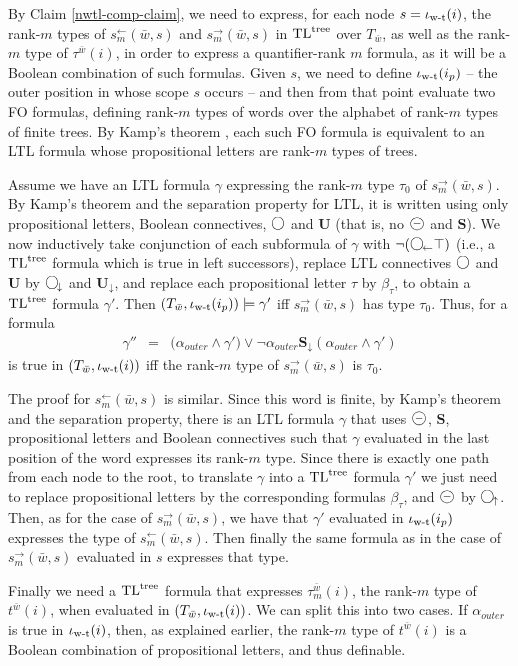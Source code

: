 \documentclass{LMCS}
\newcommand{\w}{{\bar{w}}}
\newcommand{\dm}{\Diamond}
\newcommand{\X}{{\mathbf X}}
\newcommand{\U}{{\mathbf U}}
\renewcommand{\S}{{\mathbf S}}
\newcommand{\next}{\text{\raisebox{1pt}{$\bigcirc$}}}
\renewcommand{\X}{\next}
\newcommand{\Xd}{\X_{\!\downarrow}}
\newcommand{\Yd}{\X_{\!\uparrow}}
\newcommand{\Yr}{\X_{\!\leftarrow}}
\newcommand{\Ud}{\U_{\!\downarrow}}
\newcommand{\Sd}{\S_{\!\downarrow}}
\newcommand{\wt}{\iota_{\text{\rm w-t}}}
\theoremstyle{plain}
\theoremstyle{definition}
\newcommand{\prev}{{\text{\Large $\mathbf{\circleddash}$}}}
\newcommand{\tltree}{\text{\rm TL}^{\text{\rm tree}}}
\newcommand{\dmminus}{\dm^-}
\renewcommand{\dm}{\next}
\renewcommand{\dmminus}{\prev}
\newcommand{\sleft}{s^{\leftarrow}}
\newcommand{\sright}{s^{\rightarrow}}
\begin{document}
{By Claim \ref{nwtl-comp-claim}, we need to express, for each node $s=\wt(i)$,
the rank-$m$ types of $\sleft_m(\w,s)$ and $\sright_m(\w,s)$ in
$\tltree$ over $T_\w$, as well as the rank-$m$ type of $\tau^\w(i)$,
in order to express a quantifier-rank $m$ formula, as it will be a
Boolean combination of such formulas. Given $s$, we need to define
$\wt(i_p)$ -- the outer position in whose scope $s$ occurs -- and then
from that point evaluate two FO formulas, defining rank-$m$ types of
words over the alphabet of rank-$m$ types of finite trees. By Kamp's
theorem \cite{Kamp}, each such FO formula is equivalent to an LTL formula whose
propositional letters are rank-$m$ types of trees.

Assume we have an LTL formula $\gamma$ expressing the rank-$m$ type
$\tau_0$ of $\sright_m(\w,s)$. By Kamp's theorem and the separation
property for LTL, it is written using only propositional letters,
Boolean connectives, $\dm$ and $\U$ (that is, no $\dmminus$ and
$\S$). We now inductively take conjunction of each subformula of
$\gamma$ with $\neg(\Yr\top)$ (i.e., a $\tltree$ formula which is true
in left successors), replace LTL connectives $\dm$ and $\U$ by $\Xd$
and $\Ud$, and replace each propositional letter $\tau$ by
$\beta_\tau$, to obtain a $\tltree$ formula $\gamma'$. Then
$(T_\w,\wt(i_p)) \models \gamma'$ iff $\sright_m(\w,s)$ has type
$\tau_0$. Thus, for a formula 
\begin{eqnarray*}
\gamma'' & = & \big(\alpha_{outer}\wedge \gamma'\big) \vee
\neg\alpha_{outer}\Sd (\alpha_{outer}\wedge \gamma')
\end{eqnarray*}
is true in $(T_\w,\wt(i))$ iff the rank-$m$ type of $\sright_m(\w,s)$
is $\tau_0$. 

The proof for $\sleft_m(\w,s)$ is similar. Since this word is finite,
by Kamp's theorem and the separation property, there is an LTL formula
$\gamma$ that uses $\dmminus$, $\S$, propositional letters and Boolean
connectives such that $\gamma$ evaluated in the last position of the
word expresses its rank-$m$ type. Since there is exactly one path from
each node to the root, to translate $\gamma$ into a $\tltree$ formula
$\gamma'$ we just need to replace propositional letters by the corresponding
formulas $\beta_\tau$, and $\dmminus$ by $\Yd$. Then, as for the case 
of $\sright_m(\w,s)$, we have that $\gamma'$ evaluated in $\wt(i_p)$
expresses the type of $\sleft_m(\w,s)$. Then finally the same formula
as in the case of $\sright_m(\w,s)$ evaluated in $s$ expresses that
type.

Finally we need a $\tltree$ formula that expresses $\tau_m^\w(i)$, the
rank-$m$ type of $t^\w(i)$, when evaluated in $(T_\w,\wt(i))$. 
We can split this into two cases. If $\alpha_{outer}$ is 
true in $\wt(i)$, then, as explained earlier,
the rank-$m$ type of $t^\w(i)$ is a Boolean combination of
propositional 
letters, and thus definable. 

}
\end{document}
